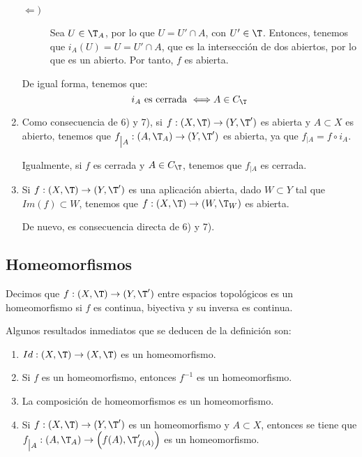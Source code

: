 \begin{ejemplo}
\begin{enumerate}
\begin{description}
        \item[$\Longleftarrow)$] Sea $U\in \T_A$, por lo que $U=U'\cap A$, con $U'\in \T$. Entonces, tenemos que $i_A(U)=U=U'\cap A$, que es la intersección de dos abiertos, por lo que es un abierto. Por tanto, $f$ es abierta.
    \end{description}

    De igual forma, tenemos que:
    \begin{equation*}
        i_A \text{ es cerrada }\Longleftrightarrow A\in C_\T
    \end{equation*}


    \item Como consecuencia de 6) y 7), si $f:(X,\T)\to (Y,\T')$ es abierta y $A\subset X$ es abierto, tenemos que $f_{\big|A}:(A,\T_A)\to (Y,\T')$ es abierta, ya que $f_{\big| A}=f\circ i_A$.

    Igualmente, si $f$ es cerrada y $A\in C_\T$, tenemos que $f_{\big| A}$ es cerrada.

    \item Si $f:(X,\T)\to (Y,\T')$ es una aplicación abierta, dado $W\subset Y$ tal que $Im(f)\subset W$, tenemos que $f:(X,\T)\to (W,\T_W)$ es abierta.

    De nuevo, es consecuencia directa de 6) y 7).
\end{enumerate}
\end{ejemplo}

\subsection{Homeomorfismos}
\begin{definicion}[Homeomorfismos]
    Decimos que $f:(X,\T)\to (Y,\T')$ entre espacios topológicos es un homeomorfismo si $f$ es continua, biyectiva y su inversa es continua.
\end{definicion}

Algunos resultados inmediatos que se deducen de la definición son:
\begin{enumerate}
    \item $Id:(X,\T)\to (X,\T)$ es un homeomorfismo.
    \item Si $f$ es un homeomorfismo, entonces $f^{-1}$ es un homeomorfismo.
    \item La composición de homeomorfismos es un homeomorfismo.
    \item Si $f:(X,\T)\to (Y,\T')$ es un homeomorfismo y $A\subset X$, entonces se tiene que $f_{\big|A}:(A,\T_A)\to \left(f(A),\T'_{f(A)}\right)$ es un homeomorfismo.
\end{enumerate}

